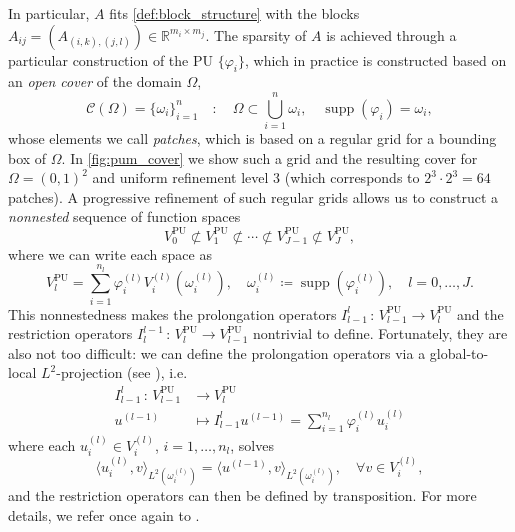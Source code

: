 \documentclass[a4paper]{article}
\DeclareMathOperator{\supp}{supp}
\theoremstyle{plain}
\theoremstyle{definition}
\theoremstyle{remark}
\begin{document}
In particular, \(A\) fits \cref{def:block_structure} with the blocks \(A_{ij} = (A_{(i,k),(j,l)}) \in \mathbb{R}^{m_i \times m_j}\). The sparsity of \(A\) is achieved through a particular construction of the PU \(\{\varphi_i\}\), which in practice is constructed based on an \emph{open cover} of the domain \(\Omega\),
\begin{equation*}
	\mathcal{C}(\Omega) = \{\omega_i\}_{i=1}^n \quad\colon\quad \Omega \subset \bigcup_{i=1}^n \omega_i, \quad \supp(\varphi_i) = \omega_i,
\end{equation*}
whose elements we call \emph{patches}, which is based on a regular grid for a bounding box of \(\Omega\). In \cref{fig:pum_cover} we show such a grid and the resulting cover for \(\Omega = (0, 1)^2\) and uniform refinement level 3 (which corresponds to \(2^3\cdot 2^3 = 64\) patches). A progressive refinement of such regular grids allows us to construct a \emph{nonnested} sequence of function spaces
\begin{equation*}
	V_0^{\mathrm{PU}} \not\subset V_1^{\mathrm{PU}} \not\subset \cdots \not\subset V_{J-1}^{\mathrm{PU}} \not\subset V_{J}^{\mathrm{PU}},
\end{equation*}
where we can write each space as
\begin{equation*}
	V_{l}^{\mathrm{PU}} = \sum_{i=1}^{n_{l}} \varphi^{(l)}_{i} V^{(l)}_{i}\left( \omega^{(l)}_{i} \right), \quad \omega^{(l)}_{i} \coloneqq \supp \left( \varphi^{(l)}_{i} \right), \quad l = 0,\dots,J.
\end{equation*}
This nonnestedness makes the prolongation operators \(I_{l-1}^{l} \,\colon\, V_{l-1}^{\mathrm{PU}} \to V_{l}^{\mathrm{PU}}\) and the restriction operators \(I^{l-1}_{l} \,\colon\, V_{l}^{\mathrm{PU}} \to V_{l-1}^{\mathrm{PU}}\) nontrivial to define. Fortunately, they are also not too difficult: we can define the prolongation operators via a global-to-local \(L^2\)-projection (see \cite{Schweitzer2003}), i.e.
\begin{align*}
	I_{l-1}^{l} \,\colon\, V_{l-1}^{\mathrm{PU}} &\to V_{l}^{\mathrm{PU}}\\
	u^{(l-1)} &\mapsto I_{l-1}^{l} u^{(l-1)} = \sum_{i=1}^{n_{l}} \varphi^{(l)}_{i} u^{(l)}_i
\end{align*}
where each \(u^{(l)}_i \in V^{(l)}_{i}\), \(i=1,\dots,n_{l}\), solves
\begin{equation*}
	\langle u^{(l)}_i, v \rangle_{L^2\left(\omega^{(l)}_{i}\right)} = \langle u^{(l-1)}, v \rangle_{L^2\left(\omega^{(l)}_{i}\right)}, \quad \forall v \in V^{(l)}_{i},
\end{equation*}
and the restriction operators can then be defined by transposition. For more details, we refer once again to \cite{Schweitzer2003, Griebel2002, JimenezRecio2024}.
\end{document}
